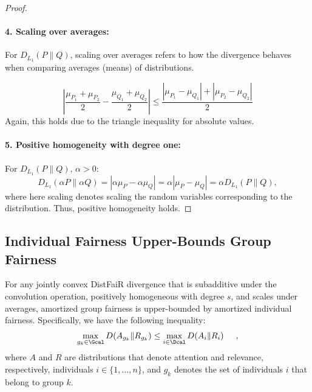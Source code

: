 \begin{proof}
\paragraph{4. Scaling over averages:}
For $D_{L_1}(P \| Q)$, scaling over averages refers to how the divergence behaves when comparing averages (means) of distributions.

\[
\left| \frac{\mu_{P_1} + \mu_{P_2}}{2} - \frac{\mu_{Q_1} + \mu_{Q_2}}{2} \right| \leq \frac{|\mu_{P_1} - \mu_{Q_1}| + |\mu_{P_2} - \mu_{Q_2}|}{2}
\]
Again, this holds due to the triangle inequality for absolute values.

\paragraph{5. Positive homogeneity with degree one:}
For $D_{L_1}(P \| Q)$, $\alpha > 0$:
\[
D_{L_1}(\alpha P \| \alpha Q) = |\alpha \mu_P - \alpha \mu_Q| = \alpha |\mu_P - \mu_Q| = \alpha D_{L_1}(P \| Q),
\] where here scaling denotes scaling the random variables corresponding to the distribution.
Thus, positive homogeneity holds.

\end{proof}




\subsection{Individual Fairness Upper-Bounds Group Fairness}
\label{ref:sec_proof}
\begin{theorem}
    For any jointly convex DistFaiR divergence that is subadditive under the convolution operation, positively homogeneous with degree $s$, and scales under averages, amortized group fairness is upper-bounded by amortized individual fairness. Specifically, we have the following inequality:
    \begin{align}
        \max_{g_k \in \Gcal} D(A_{g_k} \| R_{g_k}) \leq   
 \max_{i \in \Dcal} D(A_i \| R_i) \hspace{0.5cm},
    \end{align}
where $A$ and $R$ are distributions that denote attention and relevance, respectively, individuals $i\in \{1, \ldots, n\}$, and $g_k$ denotes the set of individuals $i$ that belong to group $k$.
\end{theorem}

